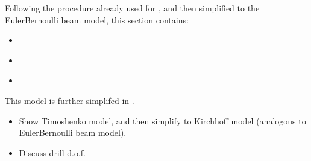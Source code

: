 \documentclass[letterpaper,10pt,english]{jupyterBook}
\begin{document}
\sphinxAtStartPar
Following the procedure already used for {\hyperref[\detokenize{ch/solids/beams/timoshenko:solid-mechanics-small-displacements-beams-timoshenko}]{}}, and then simplified to the Euler\sphinxhyphen{}Bernoulli beam model, this section contains:
\begin{itemize}
\item {} 
\sphinxAtStartPar
{\hyperref[\detokenize{ch/solids/plates-shells/timoshenko:solid-mechanics-small-displacements-plates-shells-kirchhoff-assumptions}]{}}

\item {} 
\sphinxAtStartPar
{\hyperref[\detokenize{ch/solids/plates-shells/timoshenko:solid-mechanics-small-displacements-plates-shells-kirchhoff-internal-actions}]{}}

\item {} 
\sphinxAtStartPar
{\hyperref[\detokenize{ch/solids/plates-shells/timoshenko:solid-mechanics-small-displacements-plates-shells-kirchhoff-balance-equations}]{}}

\end{itemize}

\sphinxAtStartPar
This model is further simplifed in {\hyperref[\detokenize{ch/solids/plates-shells/kirchhoff:solid-mechanics-small-displacements-plates-shells-kirchhoff}]{}}.

\sphinxAtStartPar
{}
\begin{itemize}
\item {} 
\sphinxAtStartPar
Show Timoshenko model, and then simplify to Kirchhoff model (analogous to Euler\sphinxhyphen{}Bernoulli beam model).

\item {} 
\sphinxAtStartPar
Discuss drill d.o.f.

\end{itemize}
\end{document}

